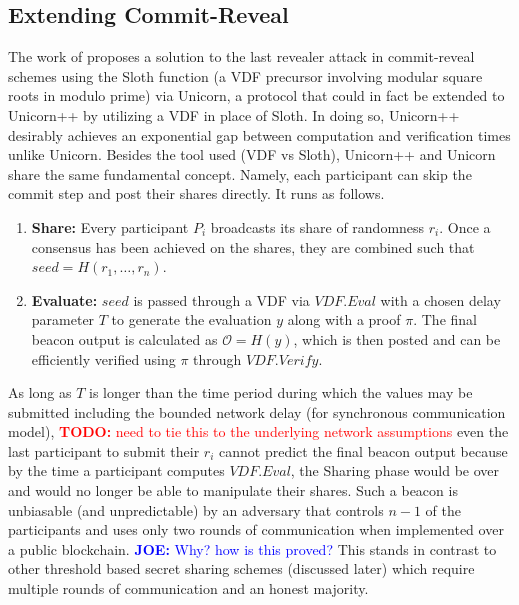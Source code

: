 \documentclass[letterpaper,twocolumn,10pt]{article}
\theoremstyle{definition}
\theoremstyle{remark}
\newcommand{\todo}[1]{\textcolor{red}{\textbf{TODO:} #1}}
\newcommand{\joenote}[1]{\textcolor{blue}{\textbf{JOE:} #1}}
\begin{document}
\subsection{Extending Commit-Reveal}
The work of \cite{lenstra2015random} proposes a solution to the last revealer attack in commit-reveal schemes using the Sloth function (a VDF precursor involving modular square roots in modulo prime) via Unicorn, a protocol that could in fact be extended to Unicorn++ by utilizing a VDF in place of Sloth. In doing so, Unicorn++ desirably achieves an exponential gap between computation and verification times unlike Unicorn. Besides the tool used (VDF vs Sloth), Unicorn++ and Unicorn share the same fundamental concept. Namely, each participant can skip the commit step and post their shares directly. It runs as follows.
\begin{enumerate}
    \item \textbf{Share:} Every participant $P_i$ broadcasts its share of randomness $r_i$. Once a consensus has been achieved on the shares, they are combined such that  $seed = H(r_1,\ldots, r_n)$.
    \item \textbf{Evaluate:} $seed$ is passed through a VDF via $VDF.Eval$ with a chosen delay parameter $T$ to generate the evaluation $y$ along with a proof $\pi$. The final beacon output is calculated as $\mathcal{O} = H(y) $, which is then posted and can be efficiently verified using $\pi$ through $VDF.Verify$.
\end{enumerate}
As long as $T$ is longer than the time period during which the values may be submitted including the bounded network delay (for synchronous communication model), \todo{need to tie this to the underlying network assumptions} even the last participant to submit their $r_i$ cannot predict the final beacon output because by the time a participant computes $VDF.Eval$, the Sharing phase would be over and would no longer be able to manipulate their shares. Such a beacon is unbiasable (and unpredictable) by an adversary that controls $n-1$ of the participants and uses only two rounds of communication when implemented over a public blockchain. \joenote{Why? how is this proved?} This stands in contrast to other threshold based secret sharing schemes (discussed later) which require multiple rounds of communication and an honest majority.
\end{document}
